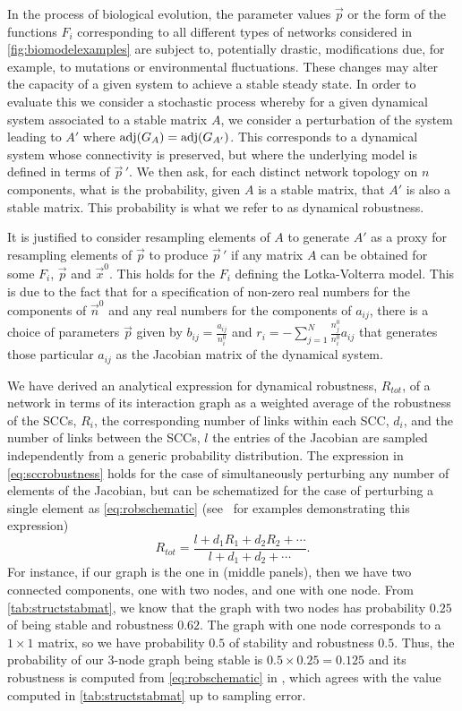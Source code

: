 In the process of biological evolution, the parameter values $\vec{p}$ or the form of the functions $F_i$ corresponding to all different types of networks considered in \ref{fig:biomodelexamples} are subject to, potentially drastic, modifications due, for example, to mutations or environmental fluctuations. These changes may alter the capacity of a given system to achieve a stable steady state. In order to evaluate this we consider a stochastic process whereby for a given dynamical system associated to a stable matrix $A$, we consider a perturbation of the system leading to $A'$ where $\mathrm{adj}(G_A) = \mathrm{adj}(G_{A'})$. This corresponds to a dynamical system whose connectivity is preserved, but where the underlying model is defined in terms of ${\vec{p}}\,'$. We then ask, for each distinct network topology on $n$ components, what is the probability, given $A$ is a stable matrix, that $A'$ is also a stable matrix. This probability is what we refer to as dynamical robustness.

It is justified to consider resampling elements of $A$ to generate $A'$ as a proxy for resampling elements of $\vec{p}$ to produce $\vec{p}\,'$ if any matrix $A$ can be obtained for some $F_i$, $\vec{p}$ and $\vec{x}^0$. This holds for the $F_i$ defining the Lotka-Volterra model. This is due to the fact that for a specification of non-zero real numbers for the components of $\vec{n}^0$ and any real numbers for the components of $a_{ij}$, there is a choice of parameters $\vec{p}$ given by $b_{ij} = \frac{a_{ij}}{n_i^0}$ and $r_i = - \sum_{j=1}^N \frac{n_j^0}{n_i^0} a_{ij}$ that generates those particular $a_{ij}$ as the Jacobian matrix of the dynamical system.

We have derived an analytical expression for dynamical robustness, $R_{tot}$, of a network in terms of its interaction graph as a weighted average of the robustness of the SCCs, $R_i$, the corresponding number of links within each SCC, $d_i$, and the number of links between the SCCs, $l$ the entries of the Jacobian are sampled independently from a generic probability distribution. The expression in \ref{eq:sccrobustness} holds for the case of simultaneously perturbing any number of elements of the Jacobian, but can be schematized for the case of perturbing a single element as \ref{eq:robschematic} (see $\,$ for examples demonstrating this expression)
\begin{equation}\label{eq:robschematic}
R_{tot} = \frac{l+d_1 R_1 + d_2 R_2 + \cdots}{l+d_1 + d_2 + \cdots}.
\end{equation}
For instance, if our graph is the one in  (middle panels), then we have two connected components, one with two nodes, and one with one node.  From \ref{tab:structstabmat}, we know that the graph with two nodes has probability $0.25$ of being stable and robustness $0.62$.  The graph with one node corresponds to a $1 \times 1$ matrix, so we have probability $0.5$ of stability and robustness $0.5$.  Thus, the probability of our 3-node graph being stable is $0.5 \times 0.25 = 0.125$ and its robustness is computed from \ref{eq:robschematic} in , which agrees with the value computed in \ref{tab:structstabmat} up to sampling error.


